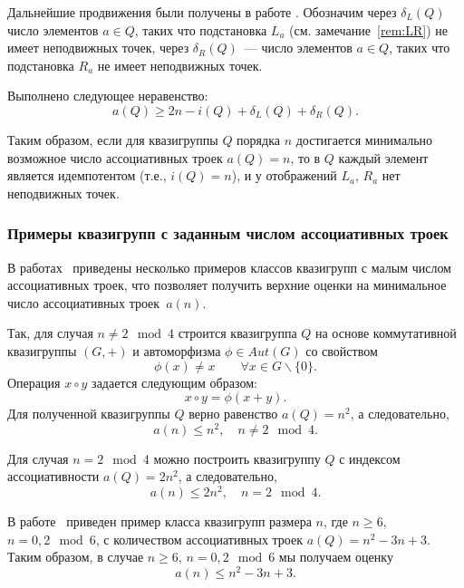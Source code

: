     Дальнейшие продвижения были получены в работе \cite{drapal2019high}.
    Обозначим через $\delta_L(Q)$ число элементов $a \in Q$, таких что подстановка $L_a$ (см. замечание~\ref{rem:LR}) не имеет неподвижных точек, через $\delta_R(Q)$~--- число элементов $a \in Q$, таких что подстановка $R_a$ не имеет неподвижных точек.
    \begin{proposition}
        Выполнено следующее неравенство:
        \[
            a(Q) \ge 2n - i(Q) + \delta_L(Q) + \delta_R(Q).
        \]
    \end{proposition}
    Таким образом, если для квазигруппы $Q$ порядка $n$ достигается минимально возможное число ассоциативных троек $a(Q) = n$, то в $Q$ каждый элемент является идемпотентом (т.е., $i(Q) = n$), и у отображений $L_a$, $R_a$ нет неподвижных точек.


\subsubsection{Примеры квазигрупп с заданным числом ассоциативных троек}

    В работах~\cite{kotzig83, ass_summary} приведены несколько примеров классов квазигрупп с малым числом ассоциативных троек, что позволяет получить верхние оценки на минимальное число ассоциативных троек~$a(n)$.

    Так, для случая $n \ne 2 \mod 4$ строится квазигруппа $Q$ на основе коммутативной квазигруппы $(G, +)$ и автоморфизма $\phi \in Aut(G)$ со свойством
    \[
        \phi(x) \ne x \qquad \forall x \in G \backslash \{ 0 \}.
    \]
    Операция $x \circ y$ задается следующим образом:
    \[
        x \circ y = \phi(x + y).
    \]
    Для полученной квазигруппы $Q$ верно равенство $a(Q) = n^2$, а следовательно, 
    \[
        a(n) \le n^2, \quad n \ne 2 \mod 4.
    \]

    Для случая $n = 2 \mod 4$ можно построить квазигруппу $Q$ с индексом ассоциативности $a(Q) = 2n^2$, а следовательно, 
    \[
        a(n) \le 2n^2, \quad n = 2 \mod 4.
    \]

    В работе~\cite{kotzig83} приведен пример класса квазигрупп размера $n$, где $n \ge 6$, $n = 0, 2 \mod 6$, с количеством ассоциативных троек $a(Q) = n^2 - 3n + 3$. 
    Таким образом, в случае $n \ge 6$, ${n = 0, 2 \mod 6}$ мы получаем оценку 
    \[
        a(n) \le n^2 - 3n + 3.
    \]

